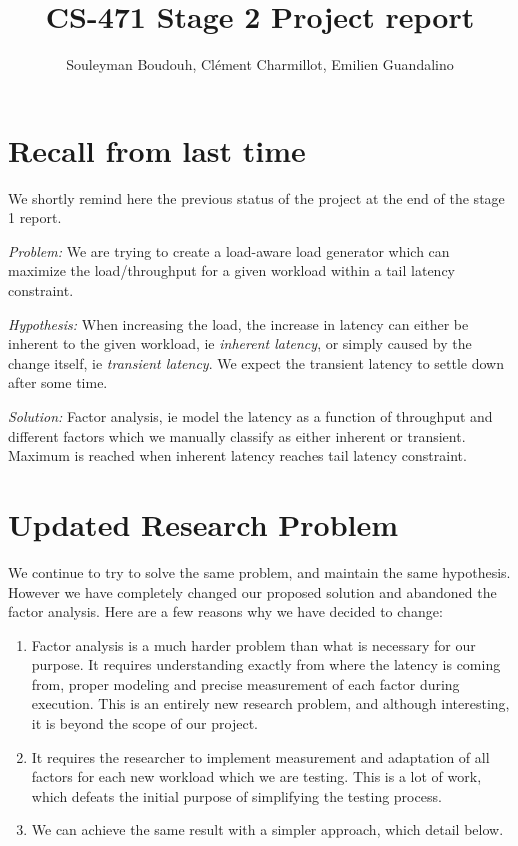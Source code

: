 \documentclass[12pt]{article}
\author{
  Souleyman Boudouh, Clément Charmillot, Emilien Guandalino\\
}
\begin{document}
\title{CS-471 Stage 2 Project report}
\date{}
\maketitle

\vspace{-3em}

\section{Recall from last time}

We shortly remind here the previous status of the project at the end of the stage 1 report.

\vspace{0.5em}

\noindent \textit{Problem:} We are trying to create a load-aware load generator which can maximize the load/throughput for a given workload within a tail latency constraint.

\vspace{0.5em}

\noindent \textit{Hypothesis:} When increasing the load, the increase in latency can either be inherent to the given workload, ie \textit{inherent latency}, or simply caused by the change itself, ie \textit{transient latency}. We expect the transient latency to settle down after some time.

\vspace{0.5em}

\noindent \textit{Solution:} Factor analysis, ie model the latency as a function of throughput and different factors which we manually classify as either inherent or transient. Maximum is reached when inherent latency reaches tail latency constraint.

\section{Updated Research Problem}

We continue to try to solve the same problem, and maintain the same hypothesis. However we have completely changed our proposed solution and abandoned the factor analysis. Here are a few reasons why we have decided to change:

\begin{enumerate}
	\item Factor analysis is a much harder problem than what is necessary for our purpose. It requires understanding exactly from where the latency is coming from, proper modeling and precise measurement of each factor during execution. This is an entirely new research problem, and although interesting, it is beyond the scope of our project.
	\item  It requires the researcher to implement measurement and adaptation of all factors for each new workload which we are testing. This is a lot of work, which defeats the initial purpose of simplifying the testing process.
	\item We can achieve the same result with a simpler approach, which detail below.
\end{enumerate}
\end{document}
